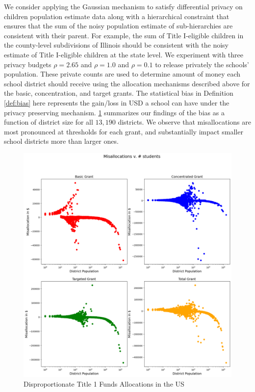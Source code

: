 \documentclass[9pt,lineno,twocolumn,twoside]{pnas-new}
\begin{document}
    We consider applying the Gaussian mechanism to satisfy differential privacy on children population estimate data along with a hierarchical constraint that ensures that the sum of the noisy population estimate of sub-hierarchies are consistent with their parent. For example, the sum of Title I-eligible children in the county-level subdivisions of Illinois should be consistent with the noisy estimate of Title I-eligible children at the state level. We experiment with three privacy budgets $\rho =  2.65$ and $\rho = 1.0$ and $\rho = 0.1$ to release privately the schools' population. These private counts are used to determine amount of money each school district should receive using the allocation mechanisms described above for the basic, concentration, and target grants. The statistical bias in Definition \ref{def:bias} here represents the gain/loss in USD a school can have under the privacy preserving mechanism. \ref{fig:missallocs_total} summarizes our findings of the bias as a function of district size for all $13,190$ districts. We observe that misallocations are most pronounced at thresholds for each grant, and substantially impact smaller school districts more than larger ones.

    \begin{figure}[h]
        \centering
        \includegraphics[width=0.7\linewidth]{images/all_grant_errors_total.png}
        \caption{Disproportionate Title 1 Funds Allocations in the US}
        \label{fig:missallocs_total}
    \end{figure}
\end{document}
